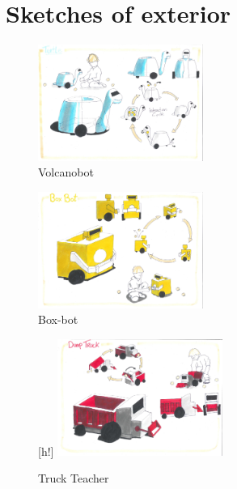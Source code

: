 \documentclass[11pt,twoside,a4paper]{report}
\begin{document}
\section{Sketches of exterior}
\begin{figure}
  \begin{center}
    \includegraphics[width=0.48\textwidth]{Images/VolcanoBotConcept.pdf}
  \end{center}
  \caption{Volcanobot}
  \label{figure:volcanobot2}
\end{figure}
\begin{figure}
  \begin{center}
    \includegraphics[width=0.48\textwidth]{Images/BoxBotConcept.pdf}
  \end{center}
  \caption{Box-bot}
  \label{figure:boxbot2}
\end{figure}
\begin{figure}
  \begin{center}[h!]
    \includegraphics[width=0.48\textwidth]{Images/TruckTeacherConcept.pdf}
  \end{center}
  \caption{Truck Teacher}
  \label{figure:truckteacher2}
\end{figure}
\end{document}
